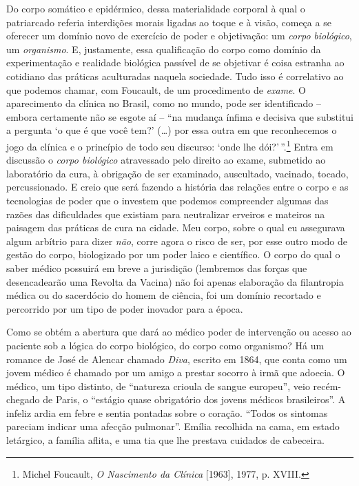 Do corpo somático e epidérmico, dessa materialidade corporal à qual o
patriarcado referia interdições morais ligadas ao toque e à visão,
começa a se oferecer um domínio novo de exercício de poder e
objetivação: um \emph{corpo} \emph{biológico}, um \emph{organismo}. E,
justamente, essa qualificação do corpo como domínio da experimentação e
realidade biológica passível de se objetivar é coisa estranha ao
cotidiano das práticas aculturadas naquela sociedade. Tudo isso é
correlativo ao que podemos chamar, com Foucault, de um procedimento de
\emph{exame}. O aparecimento da clínica no Brasil, como no mundo, pode
ser identificado -- embora certamente não se esgote aí -- ``na mudança
ínfima e decisiva que substitui a pergunta `o que é que você tem?'
(\ldots{}) por essa outra em que reconhecemos o jogo da clínica e o
princípio de todo seu discurso: `onde lhe dói?'\,''.\footnote{Michel
  Foucault, \emph{O Nascimento da Clínica} {[}1963{]}, 1977, p. XVIII.}
Entra em discussão o \emph{corpo biológico} atravessado pelo direito ao
exame, submetido ao laboratório da cura, à obrigação de ser examinado,
auscultado, vacinado, tocado, percussionado. E creio que será fazendo a
história das relações entre o corpo e as tecnologias de poder que o
investem que podemos compreender algumas das razões das dificuldades que
existiam para neutralizar erveiros e mateiros na paisagem das práticas
de cura na cidade. Meu corpo, sobre o qual eu assegurava algum arbítrio
para dizer \emph{não}, corre agora o risco de ser, por esse outro modo
de gestão do corpo, biologizado por um poder laico e científico. O corpo
do qual o saber médico possuirá em breve a jurisdição (lembremos das
forças que desencadearão uma Revolta da Vacina) não foi apenas
elaboração da filantropia médica ou do sacerdócio do homem de ciência,
foi um domínio recortado e percorrido por um tipo de poder inovador para
a época.

Como se obtém a abertura que dará ao médico poder de intervenção ou
acesso ao paciente sob a lógica do corpo biológico, do corpo como
organismo? Há um romance de José de Alencar chamado \emph{Diva}, escrito
em 1864, que conta como um jovem médico é chamado por um amigo a prestar
socorro à irmã que adoecia. O médico, um tipo distinto, de ``natureza
crioula de sangue europeu'', veio recém-chegado de Paris, o ``estágio
quase obrigatório dos jovens médicos brasileiros''. A infeliz ardia em
febre e sentia pontadas sobre o coração. ``Todos os sintomas pareciam
indicar uma afecção pulmonar''. Emília recolhida na cama, em estado
letárgico, a família aflita, e uma tia que lhe prestava cuidados de
cabeceira.

